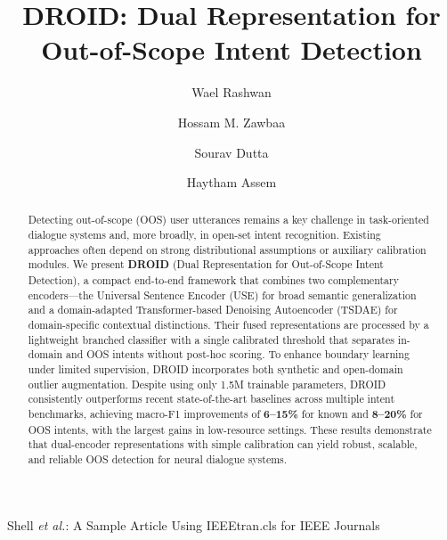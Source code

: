 \documentclass[journal,letterpaper]{IEEEtran}
\begin{document}
\title{%
DROID: Dual Representation for Out-of-Scope Intent Detection}


\author[1, 2]{Wael Rashwan}
\author[2]{Hossam M. Zawbaa}
\author[3]{Sourav Dutta}
\author[4]{Haytham Assem}

%
{Shell \MakeLowercase{\textit{et al.}}: A Sample Article Using IEEEtran.cls for IEEE Journals}


\maketitle

\begin{abstract}
Detecting out-of-scope (OOS) user utterances remains a key challenge in task-oriented dialogue systems and, more broadly, in open-set intent recognition. Existing approaches often depend on strong distributional assumptions or auxiliary calibration modules. We present \textbf{DROID} (Dual Representation for Out-of-Scope Intent Detection), a compact end-to-end framework that combines two complementary encoders—the Universal Sentence Encoder (USE) for broad semantic generalization and a domain-adapted Transformer-based Denoising Autoencoder (TSDAE) for domain-specific contextual distinctions. Their fused representations are processed by a lightweight branched classifier with a single calibrated threshold that separates in-domain and OOS intents without post-hoc scoring. To enhance boundary learning under limited supervision, DROID incorporates both synthetic and open-domain outlier augmentation. Despite using only 1.5M trainable parameters, DROID consistently outperforms recent state-of-the-art baselines across multiple intent benchmarks, achieving macro-F1 improvements of \textbf{6--15\%} for known and \textbf{8--20\%} for OOS intents, with the largest gains in low-resource settings. These results demonstrate that dual-encoder representations with simple calibration can yield robust, scalable, and reliable OOS detection for neural dialogue systems.
\end{abstract}
\end{document}
